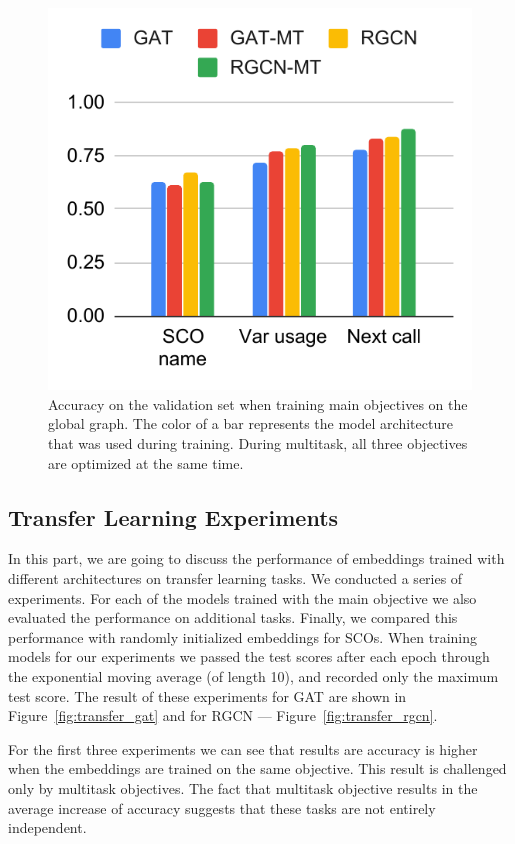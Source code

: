 \documentclass[a4paper,twoside]{article}
\begin{document}
\begin{figure}[]
    \centering
    \includegraphics{main_objective.pdf}
    \caption{Accuracy on the validation set when training main objectives on the global graph. The color of a bar represents the model architecture that was used during training. During multitask, all three objectives are optimized at the same time.}\label{fig:main_obj}
\end{figure}

\subsection{Transfer Learning Experiments}

In this part, we are going to discuss the performance of embeddings trained with different architectures on transfer learning tasks. We conducted a series of experiments. For each of the models trained with the main objective we also evaluated the performance on additional tasks. Finally, we compared this performance with randomly initialized embeddings for SCOs. When training models for our experiments we passed the test scores after each epoch through the exponential moving average (of length 10), and recorded only the maximum test score. The result of these experiments for GAT are shown in Figure~\ref{fig:transfer_gat} and for RGCN --- Figure~\ref{fig:transfer_rgcn}.

For the first three experiments we can see that results are accuracy is higher when the embeddings are trained on the same objective. This result is challenged only by multitask objectives. The fact that multitask objective results in the average increase of accuracy suggests that these tasks are not entirely independent.
\end{document}
